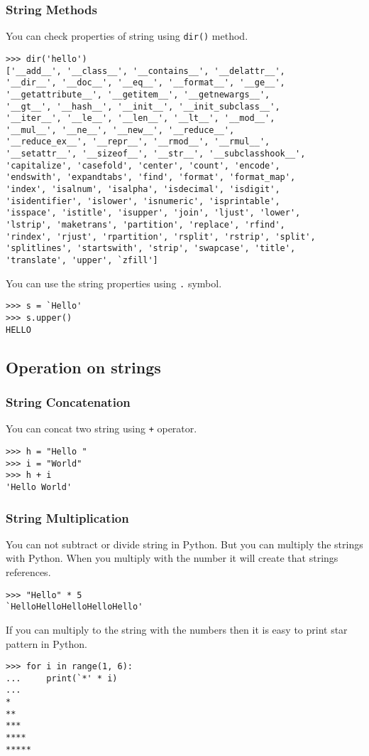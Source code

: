 \documentclass[letterpaper,12pt]{book}
\begin{document}
\subsubsection{String Methods}
You can check properties of string using \texttt{dir()} method.
\begin{lstlisting}
>>> dir('hello')
['__add__', '__class__', '__contains__', '__delattr__', 
'__dir__', '__doc__', '__eq__', '__format__', '__ge__', 
'__getattribute__', '__getitem__', '__getnewargs__', 
'__gt__', '__hash__', '__init__', '__init_subclass__', 
'__iter__', '__le__', '__len__', '__lt__', '__mod__', 
'__mul__', '__ne__', '__new__', '__reduce__', 
'__reduce_ex__', '__repr__', '__rmod__', '__rmul__', 
'__setattr__', '__sizeof__', '__str__', '__subclasshook__',
'capitalize', 'casefold', 'center', 'count', 'encode',
'endswith', 'expandtabs', 'find', 'format', 'format_map',
'index', 'isalnum', 'isalpha', 'isdecimal', 'isdigit',
'isidentifier', 'islower', 'isnumeric', 'isprintable',
'isspace', 'istitle', 'isupper', 'join', 'ljust', 'lower',
'lstrip', 'maketrans', 'partition', 'replace', 'rfind',
'rindex', 'rjust', 'rpartition', 'rsplit', 'rstrip', 'split',
'splitlines', 'startswith', 'strip', 'swapcase', 'title',
'translate', 'upper', `zfill']
\end{lstlisting}
You can use the string properties using \texttt{.} symbol.
\begin{lstlisting}
>>> s = `Hello'
>>> s.upper()
HELLO
\end{lstlisting}
\subsection{Operation on strings}
\subsubsection{String Concatenation}
You can concat two string using \texttt{+} operator.
\begin{lstlisting}
>>> h = "Hello "
>>> i = "World"
>>> h + i
'Hello World'
\end{lstlisting}
\subsubsection{String Multiplication}
You can not subtract or divide string in Python. But you can multiply the strings with Python. When you multiply with the number it will create that strings references.
\begin{lstlisting}
>>> "Hello" * 5
`HelloHelloHelloHelloHello'
\end{lstlisting}
If you can multiply to the string with the numbers then it is easy to print star pattern in Python.
\begin{lstlisting}
>>> for i in range(1, 6):
...     print(`*' * i)
... 
*
**
***
****
*****
\end{lstlisting}
\end{document}
